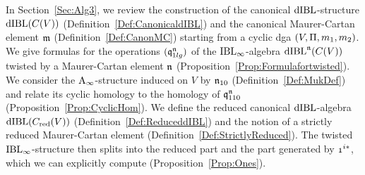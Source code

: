 \documentclass[\MainFolder/Text.tex]{subfiles}
\begin{document}
In Section~\ref{Sec:Alg3}, we review the construction of the canonical $\mathrm{dIBL}$-structure $\mathrm{dIBL}(C(V))$ (Definition~\ref{Def:CanonicaldIBL}) and the canonical Maurer-Cartan element $\mathfrak{m}$ (Definition~\ref{Def:CanonMC}) starting from a cyclic dga $(V,\Pi,m_1,m_2)$.
We give formulas for the operations $(\mathfrak{q}_{1lg}^{\mathfrak{n}})$ of the $\mathrm{IBL}_\infty$-algebra $\mathrm{dIBL}^{\mathfrak{n}}(C(V))$ twisted by a Maurer-Cartan element $\mathfrak{n}$ (Proposition~\ref{Prop:Formulafortwisted}).
We consider the $\mathrm{A}_\infty$-structure induced on $V$ by $\mathfrak{n}_{10}$ (Definition~\ref{Def:MukDef}) and relate its cyclic homology to the homology of $\mathfrak{q}_{110}^{\mathfrak{n}}$ (Proposition~\ref{Prop:CyclicHom}).
We define the reduced canonical $\mathrm{dIBL}$-algebra $\mathrm{dIBL}(C_{\mathrm{red}}(V))$ (Definition~\ref{Def:ReduceddIBL}) and the notion of a strictly reduced Maurer-Cartan element (Definition~\ref{Def:StrictlyReduced}).
The twisted $\mathrm{IBL}_\infty$-structure then splits into the reduced part and the part generated by $\NOne^{i*}$, which we can explicitly compute (Proposition~\ref{Prop:Ones}).
\end{document}
